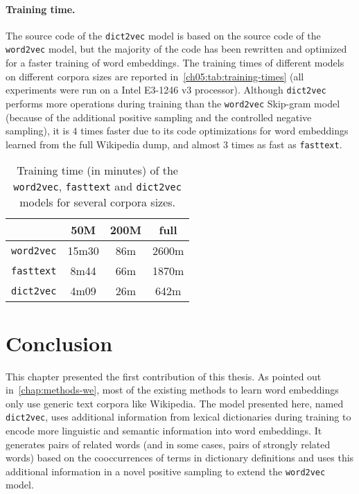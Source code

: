     \paragraph{Training time.}
      The source code of the \texttt{dict2vec} model is based on the source code
      of the \texttt{word2vec} model, but the majority of the code has been
      rewritten and optimized for a faster training of word embeddings. The
      training times of different models on different corpora sizes are reported
      in~\autoref{ch05:tab:training-times} (all experiments were run on a Intel
      E3-1246 v3 processor). Although \texttt{dict2vec} performs more operations
      during training than the \texttt{word2vec} Skip-gram model (because of the
      additional positive sampling and the controlled negative sampling), it is
      $4$ times faster due to its code optimizations for
      word embeddings learned from the full Wikipedia dump, and almost $3$ times
      as fast as \texttt{fasttext}.

      \begin{table}[h]
        \centering
        \begin{tabular}{lccc}
                            &  50M  & 200M & full \\
        \midrule
          \texttt{word2vec} & 15m30 & 86m  & 2600m \\
          \texttt{fasttext} & 8m44  & 66m  & 1870m \\
          \texttt{dict2vec} & 4m09  & 26m  & 642m \\
        \bottomrule
        \end{tabular}
        \caption[Training time of the \texttt{word2vec}, \texttt{fasttext} and
        \texttt{dict2vec} models.]{Training time (in minutes) of the
        \texttt{word2vec}, \texttt{fasttext} and \texttt{dict2vec} models for
        several corpora sizes.}
        \label{ch05:tab:training-times}
      \end{table}

\section{Conclusion}
  This chapter presented the first contribution of this thesis. As pointed out
  in~\autoref{chap:methods-we}, most of the existing methods to learn word
  embeddings only use generic text corpora like Wikipedia. The model presented
  here, named \texttt{dict2vec}, uses additional information from lexical
  dictionaries during training to encode more linguistic and semantic
  information into word embeddings. It generates pairs of related words (and in
  some cases, pairs of strongly related words) based on the cooccurrences of
  terms in dictionary definitions and uses this additional information in a
  novel positive sampling to extend the \texttt{word2vec} model.\medskip


